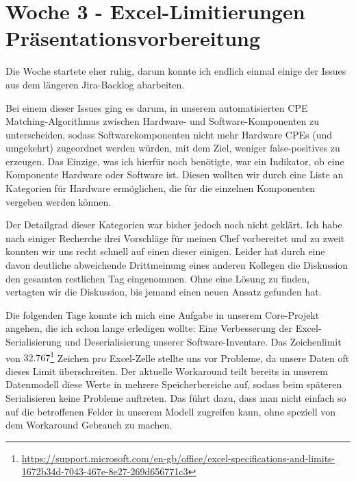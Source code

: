 \section{Woche 3 - Excel-Limitierungen \headerand Präsentationsvorbereitung} \label{sec:bericht-wo-3-initial}


\lweekdaymarginpar{\weekdayMondayLong}

Die Woche startete eher ruhig, darum konnte ich endlich einmal einige der Issues aus dem längeren Jira-Backlog abarbeiten.

Bei einem dieser Issues ging es darum, in unserem automatisierten CPE Matching-Algorithmus zwischen Hardware- und Software-Komponenten zu unterscheiden, sodass Softwarekomponenten nicht mehr Hardware CPEs (und umgekehrt) zugeordnet werden würden, mit dem Ziel, weniger false-positives zu erzeugen.
Das Einzige, was ich hierfür noch benötigte, war ein Indikator, ob eine Komponente Hardware oder Software ist.
Diesen wollten wir durch eine Liste an Kategorien für Hardware ermöglichen, die für die einzelnen Komponenten vergeben werden können.

Der Detailgrad dieser Kategorien war bisher jedoch noch nicht geklärt.
Ich habe nach einiger Recherche drei Vorschläge für meinen Chef vorbereitet und zu zweit konnten wir uns recht schnell auf einen dieser einigen.
Leider hat durch eine davon deutliche abweichende Drittmeinung eines anderen Kollegen die Diskussion den gesamten restlichen Tag eingenommen.
Ohne eine Lösung zu finden, vertagten wir die Diskussion, bis jemand einen neuen Ansatz gefunden hat.

\sweekdaymarginpar{\weekdayTuesdayShort\ - \weekdayThursdayShort}

Die folgenden Tage konnte ich mich eine Aufgabe in unserem Core-Projekt angehen, die ich schon lange erledigen wollte:
Eine Verbesserung der Excel-Serialisierung und Deserialisierung unserer Software-Inventare.
Das Zeichenlimit von $32.767$\footnote{\url{https://support.microsoft.com/en-gb/office/excel-specifications-and-limits-1672b34d-7043-467e-8e27-269d656771c3}} Zeichen pro Excel-Zelle stellte uns vor Probleme, da unsere Daten oft dieses Limit überschreiten.
Der aktuelle Workaround teilt bereits in unserem Datenmodell diese Werte in mehrere Speicherbereiche auf, sodass beim späteren Serialisieren keine Probleme auftreten.
Das führt dazu, dass man nicht einfach so auf die betroffenen Felder in unserem Modell zugreifen kann, ohne speziell von dem Workaround Gebrauch zu machen.

